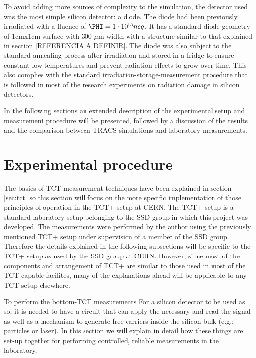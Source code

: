 To avoid adding more sources of complexity to the simulation, the detector used was the most simple silicon detector: a diode. The diode had been previously irradiated with a fluence of $\PHI = 1 \cdot 10^{15} neq$. It has a standard diode geometry of 1cmx1cm surface with 300 $\mu$m width with a structure similar to that explained in section \ref{REFERENCIA A DEFINIR}. The diode was also subject to the standard annealing process after irradiation and stored in a fridge to ensure constant low temperatures and prevent radiation effects to grow over time. This also complies with the standard irradiation-storage-measurement procedure that is followed in most of the research experiments on radiation damage in silicon detectors.

In the following sections an extended description of the experimental setup and  measurement procedure will be presented, followed by a discussion of the results and the comparison between TRACS simulations and laboratory measurements.

\section{Experimental procedure} %
\label{sec:future_improvements}

The basics of TCT measurement techniques have been explained in section \ref{sec:tct} so this section will focus on the more specific implementation of those principles of operation in the TCT+ setup at CERN. The TCT+ setup is a standard laboratory setup belonging to the SSD group in which this project was developed. The measurements were performed by the author using the previously mentioned TCT+ setup under supervision of a member of the SSD group. Therefore the details explained in the following subsections will be specific to the TCT+ setup as used by the SSD group at CERN. However, since most of the components and arrangement of TCT+ are similar to those used in most of the TCT-capable facilites, many of the explanations ahead will be applicable to any TCT setup elsewhere. 

To perform the bottom-TCT measurements For a silicon detector to be used as so, it is needed to have a circuit that can apply the necessary \vias and read the signal as well as a mechanism to generate free carriers inside the silicon bulk (e.g.: particles or laser). In this section we will explain in detail how these things are set-up together for performing controlled, reliable measurements in the laboratory.

